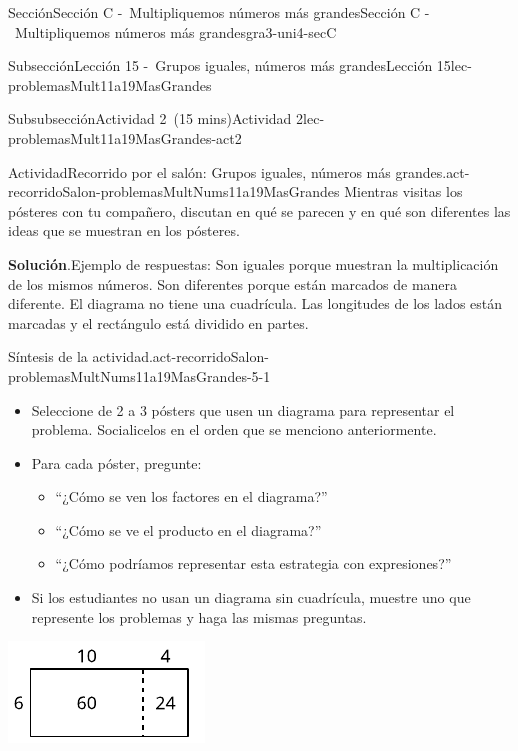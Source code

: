 \documentclass[oneside,10pt,]{article}
\newcommand{\blocktitlefont}{\relax}
\begin{document}
\begin{sectionptx}{Sección}{Sección C -~Multipliquemos números más grandes}{}{Sección C -~Multipliquemos números más grandes}{}{}{gra3-uni4-secC}
\begin{subsectionptx}{Subsección}{Lección 15 -~Grupos iguales, números más grandes}{}{Lección 15}{}{}{lec-problemasMult11a19MasGrandes}
\begin{subsubsectionptx}{Subsubsección}{Actividad 2~(15 mins)}{}{Actividad 2}{}{}{lec-problemasMult11a19MasGrandes-act2}
\begin{activity}{Actividad}{Recorrido por el salón: Grupos iguales, números más grandes.}{act-recorridoSalon-problemasMultNums11a19MasGrandes}
Mientras visitas los pósteres con tu compañero, discutan en qué se parecen y en qué son diferentes las ideas que se muestran en los pósteres.%
\par\smallskip%
\noindent\textbf{\blocktitlefont Solución}.\hypertarget{act-recorridoSalon-problemasMultNums11a19MasGrandes-3}{}\quad{}Ejemplo de respuestas: Son iguales porque muestran la multiplicación de los mismos números. Son diferentes porque están marcados de manera diferente. El diagrama no tiene una cuadrícula. Las longitudes de los lados están marcadas y el rectángulo está dividido en partes.%
\end{activity}%
\par
\begin{paragraphs}{Síntesis de la actividad.}{act-recorridoSalon-problemasMultNums11a19MasGrandes-5-1}%
%
\begin{itemize}[label=\textbullet]
\item{}Seleccione de 2 a 3 pósters que usen un diagrama para representar el problema. Socialicelos en el orden que se menciono anteriormente.%
\item{}Para cada póster, pregunte:%
%
\begin{itemize}[label=$\circ$]
\item{}``¿Cómo se ven los factores en el diagrama?''%
\item{}``¿Cómo se ve el producto en el diagrama?''%
\item{}``¿Cómo podríamos representar esta estrategia con expresiones?''%
\end{itemize}
\item{}Si los estudiantes no usan un diagrama sin cuadrícula, muestre uno que represente los problemas y haga las mismas preguntas.%
\end{itemize}
\begin{image}{0}{1}{0}{}%
\includegraphics[width=\linewidth]{external/svg-source/tikz-file-141828.pdf}

\end{image}
\end{paragraphs}
\end{subsubsectionptx}
\end{subsectionptx}
\end{sectionptx}
\end{document}
